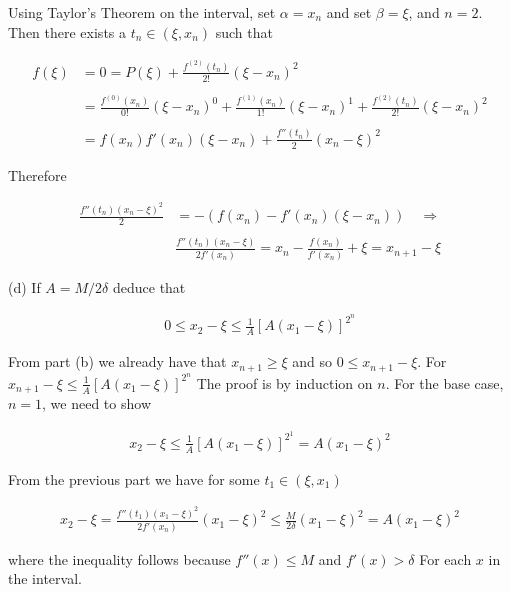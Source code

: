 \documentclass{article}
\begin{document}
  Using Taylor's Theorem on the interval, set $\alpha=x_n$ and set $\beta=\xi$, and $n=2$.  Then there exists a $t_n\in (\xi,x_n)$ such that

  \begin{align*}
    f(\xi)&=0=P(\xi)+\frac{f^{(2)}(t_n)}{2!}(\xi-x_n)^2 \\\\
    &=\frac{f^{(0)}(x_n)}{0!}(\xi-x_n)^0+\frac{f^{(1)}(x_n)}{1!}(\xi-x_n)^1+\frac{f^{(2)}(t_n)}{2!}(\xi-x_n)^2 \\\\
    &= f(x_n) f'(x_n)(\xi-x_n)+\frac{f''(t_n)}{2}(x_n-\xi)^2
  \end{align*}

  Therefore

  \begin{align*}
    \frac{f''(t_n)(x_n-\xi)^2}{2}&= -(f(x_n)-f'(x_n)(\xi-x_n)) \quad \Rightarrow \\\\
    &\frac{f''(t_n)(x_n-\xi)}{2f'(x_n)} = x_n-\frac{f(x_n)}{f'(x_n)}+\xi = x_{n+1}-\xi
  \end{align*}

  \vspace{1cm}

  {\Large \color{Sepia} (d) If $A=M/2\delta$ deduce that

  \begin{align*}
    0\leq x_2-\xi \leq \frac 1 A [A(x_1-\xi)]^{2^n}
  \end{align*}}

  \vspace{1cm}

  From part (b) we already have that $x_{n+1}\geq \xi$ and so $0\leq x_{n+1}-\xi$.  For $x_{n+1}-\xi\leq \frac 1 A[A(x_1-\xi)]^{2^n}$ The proof is by induction on $n$.  For the base case, $n=1$, we need to show

  \begin{align*}
    x_{2}-\xi \leq \frac 1 A [A(x_1-\xi)]^{2^1} = A(x_1-\xi)^2
  \end{align*}

  From the previous part we have for some $t_1\in(\xi,x_1)$

  \begin{align*}
    x_2-\xi = \frac{f''(t_1)(x_1-\xi)^2}{2f'(x_n)}(x_1-\xi)^2 \leq \frac{M}{2\delta}(x_1-\xi)^2=A(x_1-\xi)^2
  \end{align*}

  where the inequality follows because $f''(x)\leq M$ and $f'(x)>\delta$ For each $x$ in the interval.
\end{document}
